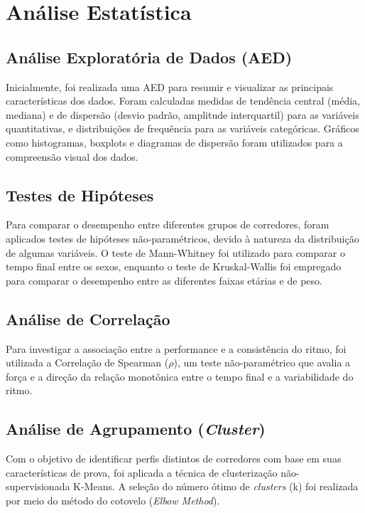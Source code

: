 \section{Análise Estatística}
\subsection{Análise Exploratória de Dados (AED)}
Inicialmente, foi realizada uma AED para resumir e visualizar as principais características dos dados. Foram calculadas medidas de tendência central (média, mediana) e de dispersão (desvio padrão, amplitude interquartil) para as variáveis quantitativas, e distribuições de frequência para as variáveis categóricas. Gráficos como histogramas, boxplots e diagramas de dispersão foram utilizados para a compreensão visual dos dados.

\subsection{Testes de Hipóteses}
Para comparar o desempenho entre diferentes grupos de corredores, foram aplicados testes de hipóteses não-paramétricos, devido à natureza da distribuição de algumas variáveis. O teste de Mann-Whitney foi utilizado para comparar o tempo final entre os sexos, enquanto o teste de Kruskal-Wallis foi empregado para comparar o desempenho entre as diferentes faixas etárias e de peso.

\subsection{Análise de Correlação}
Para investigar a associação entre a performance e a consistência do ritmo, foi utilizada a Correlação de Spearman ($\rho$), um teste não-paramétrico que avalia a força e a direção da relação monotônica entre o tempo final e a variabilidade do ritmo.

\subsection{Análise de Agrupamento (\textit{Cluster})}
Com o objetivo de identificar perfis distintos de corredores com base em suas características de prova, foi aplicada a técnica de clusterização não-supervisionada K-Means. A seleção do número ótimo de \emph{clusters} (k) foi realizada por meio do método do cotovelo (\textit{Elbow Method}).

